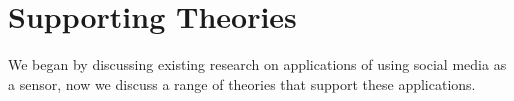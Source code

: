 \documentclass[11pt,a4paper]{article}
\begin{document}



\section{Supporting Theories}
\label{supporting_theories}
We began by discussing existing research on applications of using social media as a sensor, now we discuss a range of theories that support these applications.
\end{document}
